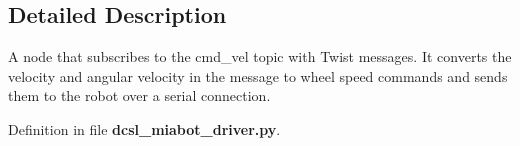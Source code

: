 \subsection{\-Detailed \-Description}
\-A node that subscribes to the cmd\-\_\-vel topic with \-Twist messages. \-It converts the velocity and angular velocity in the message to wheel speed commands and sends them to the robot over a serial connection. 

\-Definition in file {\bf dcsl\-\_\-miabot\-\_\-driver.\-py}.

